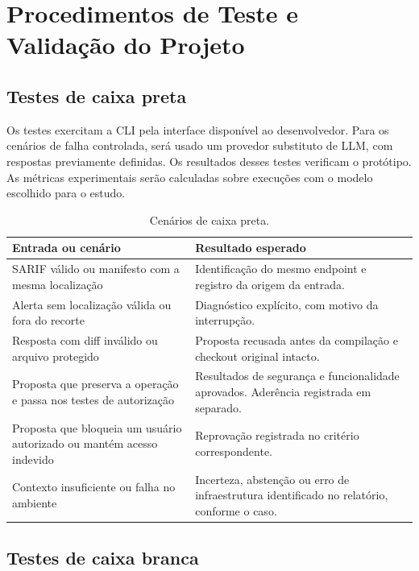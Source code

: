 \chapter{Procedimentos de Teste e Validação do Projeto}
\label{cap:testes}

\section{Testes de caixa preta}

Os testes exercitam a CLI pela interface disponível ao desenvolvedor. Para os cenários de falha controlada, será usado um provedor substituto de LLM, com respostas previamente definidas. Os resultados desses testes verificam o protótipo. As métricas experimentais serão calculadas sobre execuções com o modelo escolhido para o estudo.

\begin{table}[H]
\centering
\caption{Cenários de caixa preta.}
\label{tab:cp}
\small
\begin{tabular}{@{}p{5.1cm}p{9.2cm}@{}}
\toprule
\textbf{Entrada ou cenário} & \textbf{Resultado esperado} \\
\midrule
SARIF válido ou manifesto com a mesma localização & Identificação do mesmo endpoint e registro da origem da entrada. \\
Alerta sem localização válida ou fora do recorte & Diagnóstico explícito, com motivo da interrupção. \\
Resposta com diff inválido ou arquivo protegido & Proposta recusada antes da compilação e checkout original intacto. \\
Proposta que preserva a operação e passa nos testes de autorização & Resultados de segurança e funcionalidade aprovados. Aderência registrada em separado. \\
Proposta que bloqueia um usuário autorizado ou mantém acesso indevido & Reprovação registrada no critério correspondente. \\
Contexto insuficiente ou falha no ambiente & Incerteza, abstenção ou erro de infraestrutura identificado no relatório, conforme o caso. \\
\bottomrule
\end{tabular}
\par{}
\end{table}

\section{Testes de caixa branca}

